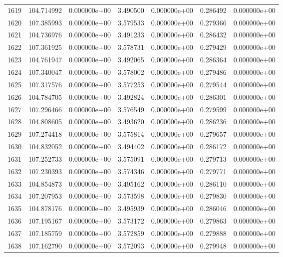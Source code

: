 \begin{tabular}{rrrrrrr}
1619 & 104.714992 &  0.000000e+00 &  3.490500 &  0.000000e+00 &    0.286492 &  0.000000e+00 \\
1620 & 107.385993 &  0.000000e+00 &  3.579533 &  0.000000e+00 &    0.279366 &  0.000000e+00 \\
1621 & 104.736976 &  0.000000e+00 &  3.491233 &  0.000000e+00 &    0.286432 &  0.000000e+00 \\
1622 & 107.361925 &  0.000000e+00 &  3.578731 &  0.000000e+00 &    0.279429 &  0.000000e+00 \\
1623 & 104.761947 &  0.000000e+00 &  3.492065 &  0.000000e+00 &    0.286364 &  0.000000e+00 \\
1624 & 107.340047 &  0.000000e+00 &  3.578002 &  0.000000e+00 &    0.279486 &  0.000000e+00 \\
1625 & 107.317576 &  0.000000e+00 &  3.577253 &  0.000000e+00 &    0.279544 &  0.000000e+00 \\
1626 & 104.784705 &  0.000000e+00 &  3.492824 &  0.000000e+00 &    0.286301 &  0.000000e+00 \\
1627 & 107.296466 &  0.000000e+00 &  3.576549 &  0.000000e+00 &    0.279599 &  0.000000e+00 \\
1628 & 104.808605 &  0.000000e+00 &  3.493620 &  0.000000e+00 &    0.286236 &  0.000000e+00 \\
1629 & 107.274418 &  0.000000e+00 &  3.575814 &  0.000000e+00 &    0.279657 &  0.000000e+00 \\
1630 & 104.832052 &  0.000000e+00 &  3.494402 &  0.000000e+00 &    0.286172 &  0.000000e+00 \\
1631 & 107.252733 &  0.000000e+00 &  3.575091 &  0.000000e+00 &    0.279713 &  0.000000e+00 \\
1632 & 107.230393 &  0.000000e+00 &  3.574346 &  0.000000e+00 &    0.279771 &  0.000000e+00 \\
1633 & 104.854873 &  0.000000e+00 &  3.495162 &  0.000000e+00 &    0.286110 &  0.000000e+00 \\
1634 & 107.207953 &  0.000000e+00 &  3.573598 &  0.000000e+00 &    0.279830 &  0.000000e+00 \\
1635 & 104.878176 &  0.000000e+00 &  3.495939 &  0.000000e+00 &    0.286046 &  0.000000e+00 \\
1636 & 107.195167 &  0.000000e+00 &  3.573172 &  0.000000e+00 &    0.279863 &  0.000000e+00 \\
1637 & 107.185759 &  0.000000e+00 &  3.572859 &  0.000000e+00 &    0.279888 &  0.000000e+00 \\
1638 & 107.162790 &  0.000000e+00 &  3.572093 &  0.000000e+00 &    0.279948 &  0.000000e+00 \\

\end{tabular}
